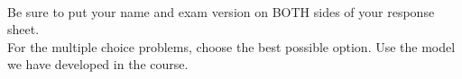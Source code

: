\clearpage
\thispagestyle{empty}

 \\

\noindent Be sure to put your name and exam version on BOTH sides of your response sheet. \\

\noindent For the multiple choice problems, choose the best possible option. Use the model we have developed in the course.

\vspace{0.4in}

 \\

\vspace{0.5in}

